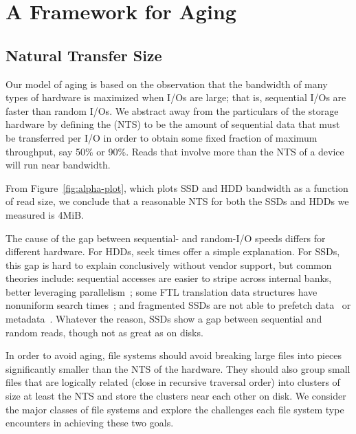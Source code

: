 \section{A Framework for Aging}\label{sec:fsa-framework}

\subsection{Natural Transfer Size}\label{sec:fsa-nts}

Our model of aging is based on the observation that the bandwidth of many types
of hardware is maximized when I/Os are large; that is, sequential I/Os are
faster than random I/Os.  We abstract away from the particulars of the storage
hardware by defining the  (NTS) to be the amount of
sequential data that must be transferred per I/O in order to obtain some fixed
fraction of maximum throughput, say 50\% or 90\%.  Reads that involve more than
the NTS of a device will run near bandwidth.

From Figure~\ref{fig:alpha-plot}, which plots SSD and HDD bandwidth as a
function of read size, we conclude that a reasonable NTS for both the SSDs and
HDDs we measured is 4MiB.

The cause of the gap between sequential- and random-I/O speeds differs for
different hardware.  For HDDs, seek times offer a simple explanation.  For
SSDs, this gap is hard to explain conclusively without vendor support, but
common theories include: sequential accesses are easier to stripe across
internal banks, better leveraging
parallelism~\cite{DBLP:conf/sigmetrics/JungK13}; some FTL translation data
structures have nonuniform search times~\cite{DBLP:journals/csur/MaFL14}; and
fragmented SSDs are not able to prefetch
data~\cite{DBLP:conf/sigmetrics/ChenKZ09} or
metadata~\cite{DBLP:conf/hotstorage/JiCSWLX16}.  Whatever the reason, SSDs show
a gap between sequential and random reads, though not as great as on disks.

In order to avoid aging, file systems should avoid breaking large files into
pieces significantly smaller than the NTS of the hardware. They should also
group small files that are logically related (close in recursive traversal
order) into clusters of size at least the NTS and store the clusters near each
other on disk.  We consider the major classes of file systems and explore the
challenges each file system type encounters in achieving these two goals.

\newcommand{\addalphaplot}[3]
{
  \addplot[color=#2, line width=0.75pt, mark=#3]
  table[x=read_size_bytes, y expr=\thisrow{read_size_bytes} * \thisrow{num_reads} / \thisrow{time_seconds} / 1000000] {fsa-data/device_measurements/#1_alpha_bw.csv};
}

